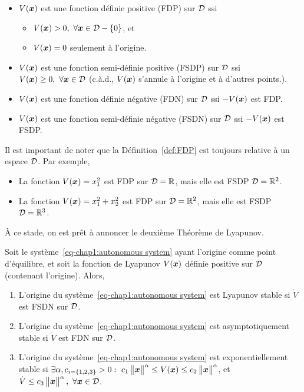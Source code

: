 \begin{definition}\label{def:FDP}
	\begin{itemize}
		\item $V(\bm{x})$ est une fonction définie positive (FDP) sur ${\cal D}$ ssi 
		\begin{itemize}
			\item $V(\bm{x})>0, \ \forall \bm{x}\in{\cal D}-\left\{0\right\}$, et
			\item $V(\bm{x})=0$ seulement à l'origine.
		\end{itemize}
		\item $V(\bm{x})$ est une fonction semi-définie positive (FSDP) sur ${\cal D}$ ssi $V(\bm{x})\geq0, \ \forall \bm{x}\in{\cal D}$ (c.à.d., $V(\bm{x})$ s'annule à l'origine et à d'autres points.).
		\item $V(\bm{x})$ est une fonction définie négative (FDN) sur ${\cal D}$ ssi  $-V(\bm{x})$ est FDP.
		\item $V(\bm{x})$ est une fonction semi-définie négative (FSDN) sur ${\cal D}$ ssi  $-V(\bm{x})$ est FSDP.
	\end{itemize}
\end{definition} 
Il est important de noter que la Définition~\ref{def:FDP} est toujours relative à un espace ${\cal D}$. Par exemple, 
\begin{itemize}
	\item La fonction $V(\bm{x}) = x_1^2$ est FDP sur ${\cal D}=\mathbb{R}$, mais elle est FSDP ${\cal D}=\mathbb{R}^2$.
	\item La fonction $V(\bm{x}) = x_1^2 + x_2^2$ est FDP sur ${\cal D}=\mathbb{R}^2$, mais elle est FSDP ${\cal D}=\mathbb{R}^3$.
\end{itemize}
À ce stade, on est prêt à annoncer le deuxième Théorème de Lyapunov.
\begin{theoreme}\label{thm:direct lyapunov method}
	Soit le système~\eqref{eq-chap1:autonomous system} ayant l'origine comme point d'équilibre, et soit la fonction de Lyapunov $V(\bm{x})$ définie positive sur ${\cal D}$ (contenant l'origine). Alors, 
	\begin{enumerate}
		\item L'origine du système~\eqref{eq-chap1:autonomous system} est  Lyapunov stable si $\dot{V}$ est FSDN sur ${\cal D}$.
		\item L'origine du système~\eqref{eq-chap1:autonomous system} est  asymptotiquement stable si $\dot{V}$ est FDN sur ${\cal D}$.
		\item L'origine du système~\eqref{eq-chap1:autonomous system} est  exponentiellement stable si $\exists\alpha,c_{{i=\left\{1,2,3\right\}}}>0:\ c_1\norm{\state}^\alpha\leq V(\state)\leq c_2\norm{\state}^\alpha$, et $ \dot{V}\leq c_3\norm{\state}^\alpha, \ \forall\state\in\setD$.
	\end{enumerate}
\end{theoreme}
